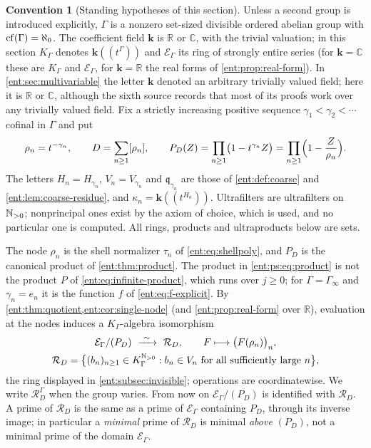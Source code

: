 \documentclass[11pt]{article}
\theoremstyle{plain}
\theoremstyle{plain}
\theoremstyle{plain}
\theoremstyle{definition}
\theoremstyle{definition}
\newtheorem{convention}[convention]{Convention}
\theoremstyle{definition}
\theoremstyle{definition}
\theoremstyle{remark}
\newcommand{\C}{\mathbb C}\newcommand{\R}{\mathbb R}
\newcommand{\K}{K_\Gamma}\newcommand{\KD}{K_\Delta}
\newcommand{\E}{\mathcal E_\Gamma}
\newcommand{\RD}{\mathcal R_D}\newcommand{\Ucal}{\mathcal U}
\newcommand{\kk}{\mathbf k}\newcommand{\PP}{\mathbb P}
\begin{document}
\begin{convention}[Standing hypotheses of this section]
\label{ent:ps:conv:standing}
Unless a second group is introduced explicitly, $\Gamma$ is a nonzero
set-sized divisible ordered abelian group with $\operatorname{cf}(\Gamma)=\aleph_0$. The
coefficient field $\kk$ is $\R$ or $\C$, with the trivial valuation; in this
section $K_\Gamma$ denotes $\kk((t^\Gamma))$ and $\mathcal E_\Gamma$ its
ring of strongly entire series (for $\kk=\C$ these are $\K$ and $\E$, for
$\kk=\R$ the real forms of \cref{ent:prop:real-form}). In
\cref{ent:sec:multivariable} the letter $\kk$ denoted an arbitrary trivially
valued field; here it is $\R$ or $\C$, although the sixth source records that
most of its proofs work over any trivially valued field. Fix a strictly
increasing positive sequence $\gamma_1<\gamma_2<\cdots$ cofinal in $\Gamma$
and put
\begin{equation}\label{ent:ps:eq:product}
 \rho_n=t^{-\gamma_n},\qquad
 D=\sum_{n\ge1}[\rho_n],\qquad
 P_D(Z)=\prod_{n\ge1}\bigl(1-t^{\gamma_n}Z\bigr)
       =\prod_{n\ge1}\Bigl(1-\frac Z{\rho_n}\Bigr).
\end{equation}
The letters $H_n=H_{\gamma_n}$, $V_n=V_{\gamma_n}$ and
$\mathfrak q_{\gamma_n}$ are those of \cref{ent:def:coarse} and
\cref{ent:lem:coarse-residue}, and $\kappa_n=\kk((t^{H_n}))$. Ultrafilters
are ultrafilters on $\mathbb N_{>0}$; nonprincipal ones exist by the axiom of choice,
which is used, and no particular one is computed. All rings, products and
ultraproducts below are sets.
\end{convention}

The node $\rho_n$ is the shell normalizer $\tau_n$ of
\eqref{ent:eq:shellpoly}, and $P_D$ is the canonical product of
\cref{ent:thm:product}. The product in \eqref{ent:ps:eq:product} is not the
product $P$ of \eqref{ent:eq:infinite-product}, which runs over $j\ge0$; for
$\Gamma=\Gamma_\infty$ and $\gamma_n=e_n$ it is the function $f$ of
\eqref{ent:eq:f-explicit}. By \cref{ent:thm:quotient,ent:cor:single-node}
(and \cref{ent:prop:real-form} over $\R$), evaluation at the nodes induces a
$K_\Gamma$-algebra isomorphism
\begin{equation}\label{ent:ps:eq:quotient}
 \begin{gathered}
 \mathcal E_\Gamma/(P_D)\ \xrightarrow{\ \sim\ }\ \RD,
 \qquad F\longmapsto\bigl(F(\rho_n)\bigr)_n ,\\
 \RD=\bigl\{(b_n)_{n\ge1}\in K_\Gamma^{\N_{>0}}:
      b_n\in V_n\text{ for all sufficiently large }n\bigr\},
 \end{gathered}
\end{equation}
the ring displayed in \cref{ent:subsec:invisible}; operations
are coordinatewise. We write $\RD^\Gamma$ when the group varies. From now on
$\mathcal E_\Gamma/(P_D)$ is identified with $\RD$. A prime of $\RD$ is the
same as a prime of $\mathcal E_\Gamma$ containing $P_D$, through its inverse
image; in particular a \emph{minimal} prime of $\RD$ is minimal \emph{above}
$(P_D)$, not a minimal prime of the domain $\mathcal E_\Gamma$.
\end{document}
